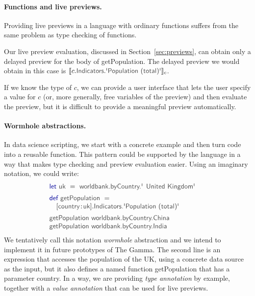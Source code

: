 \documentclass[acmsmall,anonymous,fleqn]{acmart}\settopmatter{printfolios=false,printccs=false,printacmref=false}
\theoremstyle{plain}
\theoremstyle{definition}
\newcommand{\ident}[1]{\textnormal{\textcolor{idclr}{\sffamily #1}}}
\newcommand{\kvd}[1]{\textnormal{\textcolor{kvdclr}{\sffamily #1}}}
\begin{document}
\paragraph{Functions and live previews.}
Providing live previews in a language with ordinary functions suffers from the same problem as
type checking of functions.

Our live preview evaluation, discussed in Section~\ref{sec:previews}, can obtain only a delayed
preview for the body of \ident{getPopulation}. The delayed preview we would obtain in this case
is $\llbracket c.\ident{Indicators}.\ident{\textquotesingle Population (total)\textquotesingle} \rrbracket_{c}$.

If we know the type of $c$, we can provide a user interface that lets the user specify a value
for $c$ (or, more generally, free variables of the preview) and then evaluate the preview, but
it is difficult to provide a meaningful preview automatically.

\paragraph{Wormhole abstractions.}
In data science scripting, we start with a concrete example and then turn code into a reusable
function. This pattern could be supported by the language in a way that makes type checking
and preview evaluation easier. Using an imaginary notation, we could write:
%
\begin{equation*}
\begin{array}{l}
\kvd{let}~\ident{uk}~=~\ident{worldbank.byCountry.\textquotesingle United Kingdom\textquotesingle}\hspace{1.5em}\\[0.5em]
\kvd{def}~\ident{getPopulation}~=\\
\quad\lbrack\ident{country}\!:\!\ident{uk}\rbrack.\ident{Indicators.\textquotesingle Population (total)\textquotesingle}\\[0.5em]
\ident{getPopulation}~\ident{worldbank.byCountry.China}\\
\ident{getPopulation}~\ident{worldbank.byCountry.India}
\end{array}
\end{equation*}
%
We tentatively call this notation \emph{wormhole} abstraction and we intend to implement it in future prototypes of The Gamma.
The second line is an expression that accesses the population of the UK, using a concrete
data source as the input, but it also defines a named function \ident{getPopulation} that has a
parameter \ident{country}. In a way, we are providing \emph{type annotation} by example, together
with a \emph{value annotation} that can be used for live previews.
\end{document}
